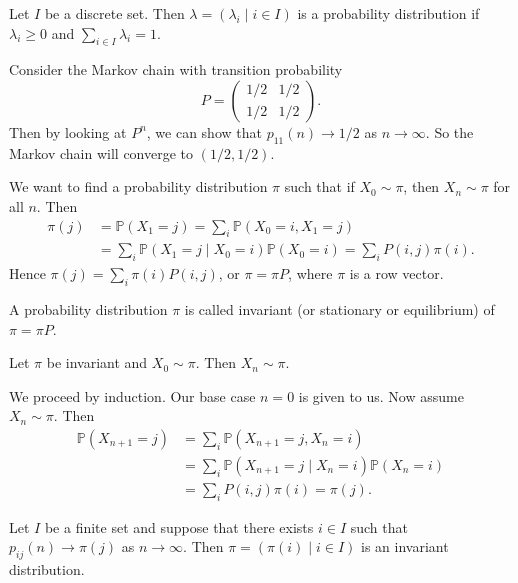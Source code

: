 \documentclass[12pt]{article}
\begin{document}
\begin{definition}
	Let $I$ be a discrete set. Then $\lambda = (\lambda_i \mid i \in I)$ is a probability distribution if $\lambda_i \geq 0$ and $\sum_{i \in I}\lambda_i = 1$.
\end{definition}

\begin{exbox}
	Consider the Markov chain with transition probability
	\[
	P =
	\begin{pmatrix}
		1/2 & 1/2 \\
		1/2 & 1/2
	\end{pmatrix}
	.\]
	Then by looking at $P^{n}$, we can show that $p_{11}(n) \to 1/2$ as $n \to \infty$. So the Markov chain will converge to $(1/2, 1/2)$.
\end{exbox}

We want to find a probability distribution $\pi$ such that if $X_0 \sim \pi$, then $X_n \sim \pi$ for all $n$. Then
\begin{align*}
	\pi(j) &= \mathbb{P}(X_1 = j) = \sum_{i} \mathbb{P}(X_0 = i, X_1 = j) \\
	       &= \sum_{i} \mathbb{P}(X_1 = j \mid X_0 = i)\mathbb{P}(X_0 = i) = \sum_{i}P(i, j) \pi(i).
\end{align*}
Hence $\pi(j) = \sum_{i} \pi(i) P(i, j)$, or $\pi = \pi P$, where $\pi$ is a row vector.

\begin{definition}
	A probability distribution $\pi$ is called invariant (or stationary or equilibrium) of $\pi = \pi P$.
\end{definition}

\begin{theorem}
	Let $\pi$ be invariant and $X_0 \sim \pi$. Then $X_n \sim \pi$.
\end{theorem}

\begin{proofbox} 
	We proceed by induction. Our base case $n = 0$ is given to us. Now assume $X_{n} \sim \pi$. Then
	\begin{align*}
		\mathbb{P}(X_{n+1} = j) &= \sum_{i} \mathbb{P}(X_{n+1} = j, X_n = i) \\
					&= \sum_{i}\mathbb{P}(X_{n+1} = j \mid X_n = i) \mathbb{P}(X_n = i) \\
					&= \sum_{i} P(i, j) \pi(i) = \pi(j).
	\end{align*}
\end{proofbox}

\begin{theorem}
	Let $I$ be a finite set and suppose that there exists $i \in I$ such that $p_{ij}(n) \to \pi(j)$ as $n \to \infty$. Then $\pi = (\pi(i) \mid i \in I)$ is an invariant distribution.
\end{theorem}
\end{document}
